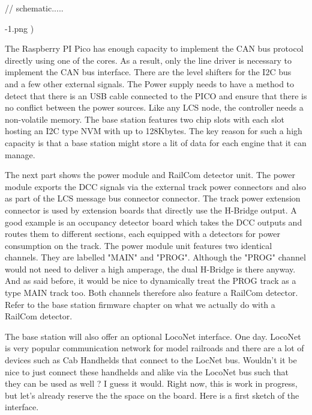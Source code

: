 // schematic.....

-1.png )

The Raspberry PI Pico has enough capacity to implement the CAN bus protocol directly using one of the cores. As a result, only the line driver is necessary to implement the CAN bus interface. There are the level shifters for the I2C bus and a few other external signals. The Power supply needs to have a method to detect that there is an USB cable connected to the PICO and ensure that there is no conflict between the power sources. Like any LCS node, the controller needs a non-volatile memory. The base station features two chip slots with each slot hosting an I2C type NVM with up to 128Kbytes. The key reason for such a high capacity is that a base station might store a lit of data for each engine that it can manage.


The next part shows the power module and RailCom detector unit. The power module exports the DCC signals via the external track power connectors and also as part of the LCS message bus connector connector. The track power extension connector is used by extension boards that directly use the H-Bridge output. A good example is an occupancy detector board which takes the DCC outputs and routes them to different sections, each equipped with a detectors for power consumption on the track. The power module unit features two identical channels. They are labelled "MAIN" and "PROG". Although the "PROG" channel would not need to deliver a high amperage, the dual H-Bridge is there anyway. And as said before, it would be nice to dynamically treat the PROG track as a type MAIN track too. Both channels therefore also feature a RailCom detector. Refer to the base station firmware chapter on what we actually do with a RailCom detector.


The base station will also offer an optional LocoNet interface. One day. LocoNet is very popular communication network for model railroads and there are a lot of devices such as Cab Handhelds that connect to the LocNet bus. Wouldn't it be nice to just connect these handhelds and alike via the LocoNet bus such that they can be used as well ? I guess it would. Right now, this is work in progress, but let's already reserve the the space on the board. Here is a first sketch of the interface.

